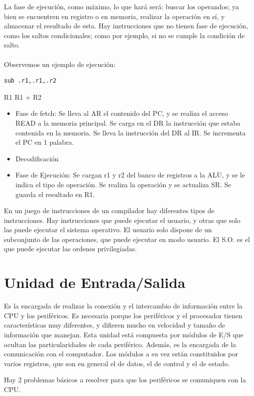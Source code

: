 \documentclass[a4paper,11pt,spanish]{report}
\begin{document}
La fase de ejecución, como máximo, lo que hará será: buscar los operandos; ya bien se encuentren en registro o en memoria, realizar la operación en sí, y almacenar el resultado de esta. Hay instrucciones que no tienen fase de ejecución, como los saltos condicionales; como por ejemplo, si no se cumple la condición de salto.
\\\\
Observemos un ejemplo de ejecución:
\begin{verbatim}
sub .r1,.r1,.r2
\end{verbatim}
R1 \textleftarrow R1 + R2
\begin{itemize}
\item Fase de fetch: 
\subitem Se lleva al AR el contenido del PC, y se realiza el acceso READ a la memoria principal. 
\subitem Se carga en el DR la instrucción que estaba contenida en la memoria.
\subitem Se lleva la instrucción del DR al IR.
\subitem Se incrementa el PC en 1 palabra.
\item Decodificación
\item Fase de Ejecución:
\subitem Se cargan r1 y r2 del banco de registros a la ALU, y se le indica el tipo de operación.
\subitem Se realiza la operación y se actualiza SR.
\subitem Se guarda el resultado en R1.
\end{itemize}

En un juego de instrucciones de un compilador hay diferentes tipos de instrucciones. Hay instrucciones que puede ejecutar el usuario, y otras que solo las puede ejecutar el sistema operativo. El usuario solo dispone de un subconjunto de las operaciones, que puede ejecutar en modo usuario. El S.O. es el que puede ejecutar las ordenes privilegiadas.

\section{Unidad de Entrada/Salida}
Es la encargada de realizar la conexión y el intercambio de información entre la CPU y los periféricos. Es necesaria porque los periféricos y el procesador tienen características muy diferentes, y difieren mucho en velocidad y tamaño de información que manejan. Esta unidad está compuesta por módulos de E/S que ocultan las particularidades de cada periférico. Además, es la encargada de la comunicación con el computador. Los módulos a su vez están constituidos por varios registros, que son en general el de datos, el de control y el de estado.

Hay 2 problemas básicos a resolver para que los periféricos se comuniquen con la CPU.
\end{document}
